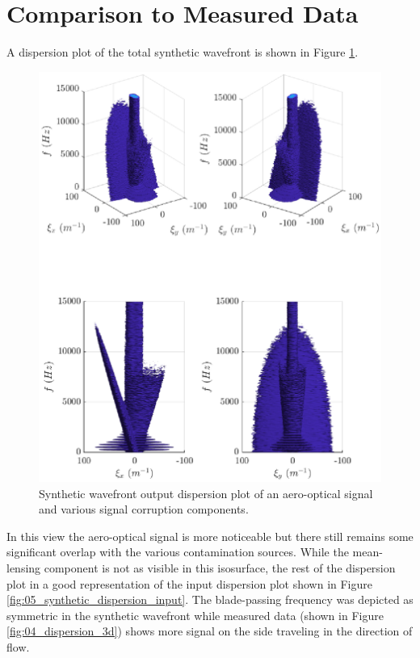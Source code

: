 \section{Comparison to Measured Data}
A dispersion plot of the total synthetic wavefront is shown in Figure \ref{fig:05_dispersion_synthetic}.
\begin{figure}
 \centering
 \includegraphics{../matlab/05_synthetic_wavefront/dispersion_synthetic.eps}
 \caption{Synthetic wavefront output dispersion plot of an aero-optical signal and various signal corruption components.}
 \label{fig:05_dispersion_synthetic}
\end{figure}
In this view the aero-optical signal is more noticeable but there still remains some significant overlap with the various contamination sources.
While the mean-lensing component is not as visible in this isosurface, the rest of the dispersion plot in a good representation of the input dispersion plot shown in Figure \ref{fig:05_synthetic_dispersion_input}.
The blade-passing frequency was depicted as symmetric in the synthetic wavefront while measured data (shown in Figure \ref{fig:04_dispersion_3d}) shows more signal on the side traveling in the direction of flow.
